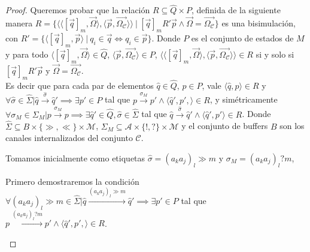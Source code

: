 \begin{proof}
Queremos probar que la relación $R \subseteq \widehat{Q} \times P$, definida de la siguiente manera $R = \{ \langle \langle [\overrightarrow{q}]_m, \overrightarrow{\Omega} \rangle, \langle \overrightarrow{p}, \overrightarrow{\Omega_{\mathcal{C}}} \rangle \rangle \ | \ [\overrightarrow{q}]_mR'\overrightarrow{p} \land  \overrightarrow{\Omega}=\overrightarrow{\Omega_{\mathcal{C}}} \}$ es una bisimulación, con $R'=\{\langle [\overrightarrow{q}]_m, \overrightarrow{p} \rangle \ | \ q_i \in \overrightarrow{q} \iff q_i \in \overrightarrow{p} \}$. Donde $P$ es el conjunto de estados de $M$ y para todo $\langle [\overrightarrow{q}]_m, \overrightarrow{\Omega} \rangle \in \widehat{Q}$, $\langle \overrightarrow{p}, \overrightarrow{\Omega_{\mathcal{C}}} \rangle \in P$, $\langle \langle [\overrightarrow{q}]_m, \overrightarrow{\Omega} \rangle, \langle \overrightarrow{p}, \overrightarrow{\Omega_{\mathcal{C}}} \rangle \rangle \in R$ si y solo si $[\overrightarrow{q}]_mR'\overrightarrow{p}$ y $\overrightarrow{\Omega}=\overrightarrow{\Omega_{\mathcal{C}}}$. \\

Es decir que para cada par de elementos $\widehat{q} \in \widehat{Q}$, $p \in P$, vale $\langle \widehat{q}, p \rangle \in R$ y $\forall \widehat{\sigma} \in \widehat{\Sigma} | \widehat{q} \xrightarrow{\widehat{\sigma}} \widehat{q}' \implies \exists p' \in P$ tal que $p \xrightarrow{\sigma_M} p' \land \langle \widehat{q}', p', \rangle \in R$, y simétricamente $\forall \sigma_M \in \Sigma_M | p \xrightarrow{\sigma_M} p \implies \exists \widehat{q}' \in \widehat{Q}, \widehat{\sigma} \in \widehat{\Sigma}$ tal que $\widehat{q} \xrightarrow{\widehat{\sigma}} \widehat{q}' \land \langle \widehat{q}', p'\rangle \in R$. Donde $\widehat{\Sigma} \subseteq B \times \{\gg,\ll\} \times \mathcal{M}$, $\Sigma_M \subseteq \mathcal{A} \times \{!,?\} \times \mathcal{M}$ y el conjunto de buffers $B$ son los canales internalizados del conjunto $\mathcal{C}$. 

Tomamos inicialmente como etiquetas $\widehat{\sigma} = (a_ka_j)_l \gg m$ y $\sigma_M = (a_ka_j)_l?m$, 

Primero demostraremos la condición $\forall (a_ka_j)_l \gg m \in \widehat{\Sigma} | \widehat{q} \xrightarrow{(a_ka_j)_l \gg m} \widehat{q}' \implies \exists p' \in P$ tal que $p \xrightarrow{(a_ka_j)_l?m} p' \land \langle \widehat{q}', p', \rangle \in R$. 
 
\begin{itemize}
    

\end{itemize}
\end{proof}
